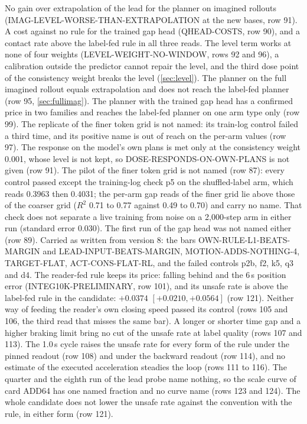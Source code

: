 \documentclass[10pt,twocolumn]{article}
\makeatletter
\theoremstyle{remark}
\renewcommand\paragraph{\@startsection{paragraph}{4}{\z@}{1.6ex \@plus .5ex \@minus .2ex}{-1em}{\normalfont\normalsize\bfseries}}
\makeatother
\begin{document}
\paragraph{Not met, as written.} No gain over extrapolation of the lead for the planner on imagined rollouts (IMAG-LEVEL-WORSE-THAN-EXTRAPOLATION at the new bases, row 91). A cost against no rule for the trained gap head (QHEAD-COSTS, row 90), and a contact rate above the label-fed rule in all three reads. The level term works at none of four weights (LEVEL-WEIGHT-NO-WINDOW, rows 92 and 96), a calibration outside the predictor cannot repair the level, and the third dose point of the consistency weight breaks the level (\cref{sec:level}). The planner on the full imagined rollout equals extrapolation and does not reach the label-fed planner (row 95, \cref{sec:fullimag}). The planner with the trained gap head has a confirmed price in two families and reaches the label-fed planner on one arm type only (row 99). The replicate of the finer token grid is not named: its train-log control failed a third time, and its positive name is out of reach on the per-arm values (row 97). The response on the model's own plans is met only at the consistency weight 0.001, whose level is not kept, so DOSE-RESPONDS-ON-OWN-PLANS is not given (row 91). The pilot of the finer token grid is not named (row 87): every control passed except the training-log check p5 on the shuffled-label arm, which reads 0.3963 then 0.4031; the per-arm gap reads of the finer grid lie above those of the coarser grid ($R^2$ 0.71 to 0.77 against 0.49 to 0.70) and carry no name. That check does not separate a live training from noise on a 2,000-step arm in either run (standard error 0.030). The first run of the gap head was not named either (row 89). Carried as written from version 8: the bars OWN-RULE-L1-BEATS-MARGIN and LEAD-INPUT-BEATS-MARGIN, MOTION-ADDS-NOTHING-4, TARGET-FLAT, ACT-CONS-FLAT-RL, and the failed controls p2b, f2, k5, q3 and d4. The reader-fed rule keeps its price: falling behind and the 6\,s position error (INTEG10K-PRELIMINARY, row 101), and its unsafe rate is above the label-fed rule in the candidate: $+0.0374$ $[+0.0210,+0.0564]$ (row 121). Neither way of feeding the reader's own closing speed passed its control (rows 105 and 106, the third read that misses the same bar). A longer or shorter time gap and a higher braking limit bring no cut of the unsafe rate at label quality (rows 107 and 113). The 1.0\,s cycle raises the unsafe rate for every form of the rule under the pinned readout (row 108) and under the backward readout (row 114), and no estimate of the executed acceleration steadies the loop (rows 111 to 116). The quarter and the eighth run of the lead probe name nothing, so the scale curve of card ADD64 has one named fraction and no curve name (rows 123 and 124). The whole candidate does not lower the unsafe rate against the convention with the rule, in either form (row 121).
\end{document}
